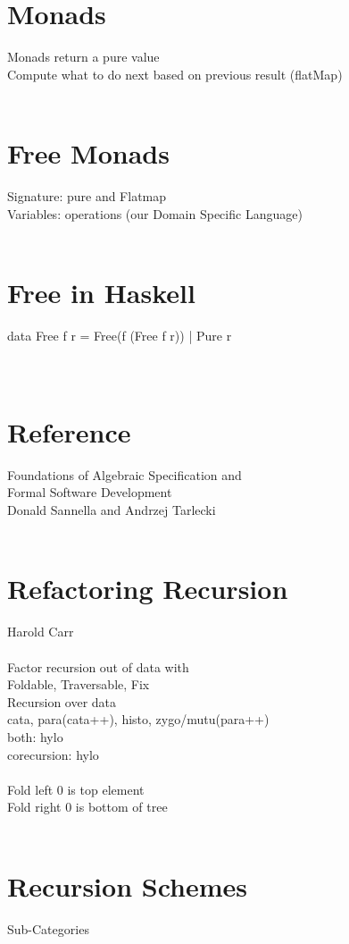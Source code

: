 \documentclass{article}
\begin{document}
\section{Monads}
Monads return a pure value
\\
Compute what to do next based on previous result (flatMap)
\\
\\
\section{Free Monads}
Signature: pure and Flatmap
\\
Variables: operations (our Domain Specific Language)
\\
\\
\section{Free in Haskell}
data Free f r = Free(f (Free f r)) | Pure r 
\\
\\
\\
\section{Reference}
Foundations of Algebraic Specification and
\\
Formal Software Development
\\
Donald Sannella and Andrzej Tarlecki
\\
\\
\section{Refactoring Recursion}
Harold Carr
\\
\\
Factor recursion out of data with
\\
Foldable, Traversable, Fix
\\
Recursion over data
\\
cata, para(cata++), histo, zygo/mutu(para++)
\\
both: hylo
\\
corecursion: hylo
\\
\\
Fold left 0 is top element
\\
Fold right 0 is bottom of tree
\\
\\
\section{Recursion Schemes}
Sub-Categories
\end{document}
